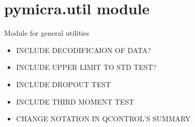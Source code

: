 \documentclass[a4paper,10pt,oneside]{sphinxmanual}
\begin{document}
\section{pymicra.util module}
\label{pymicra:module-pymicra.util}\label{pymicra:pymicra-util-module}
Module for general utilities
\begin{itemize}
\item {} 
INCLUDE DECODIFICAION OF DATA?

\item {} 
INCLUDE UPPER LIMIT TO STD TEST?

\item {} 
INCLUDE DROPOUT TEST

\item {} 
INCLUDE THIRD MOMENT TEST

\item {} 
CHANGE NOTATION IN QCONTROL'S SUMMARY

\end{itemize}
\end{document}
